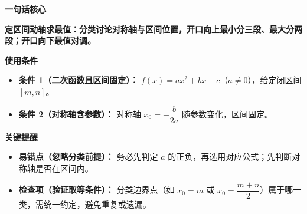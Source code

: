 \begin{summarybox}
	\textbf{\textcolor{CSummary}{一句话核心}}

	\textbf{定区间动轴求最值：分类讨论对称轴与区间位置，开口向上最小分三段、最大分两段；开口向下最值对调。}

	\medskip
	\textbf{\textcolor{CSummary}{使用条件}}
	\begin{itemize}[leftmargin=*, itemsep=0.5em, topsep=0.4em]
		\item \textbf{条件 1（二次函数且区间固定）：} $f(x)=ax^2+bx+c$（$a\neq0$），给定闭区间 $[m,n]$。
		\item \textbf{条件 2（对称轴含参数）：} 对称轴 $x_0=-\dfrac{b}{2a}$ 随参数变化，区间固定。
	\end{itemize}

	\medskip
	\textbf{\textcolor{CSummary}{关键提醒}}
	\begin{itemize}[leftmargin=*, itemsep=0.5em, topsep=0.4em]
		\item \textbf{易错点（忽略分类前提）：} 务必先判定 $a$ 的正负，再选用对应公式；先判断对称轴是否在区间内。
		\item \textbf{检查项（验证取等条件）：} 分类边界点（如 $x_0=m$ 或 $x_0=\dfrac{m+n}{2}$）属于哪一类，需统一约定，避免重复或遗漏。
	\end{itemize}
\end{summarybox}
